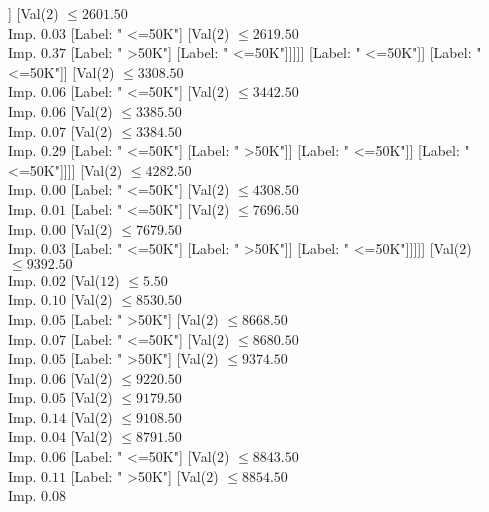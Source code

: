 \documentclass[margin=10pt]{standalone}
\begin{document}
\begin{forest}
													[Label: " >50K"]
													[Label: " <=50K"]]
												[Val($2$) $ \leq 2601.50$ \\ Imp. $0.03$
													[Label: " <=50K"]
													[Val($2$) $ \leq 2619.50$ \\ Imp. $0.37$
														[Label: " >50K"]
														[Label: " <=50K"]]]]]
										[Label: " <=50K"]]
									[Label: " <=50K"]]
								[Val($2$) $ \leq 3308.50$ \\ Imp. $0.06$
									[Label: " <=50K"]
									[Val($2$) $ \leq 3442.50$ \\ Imp. $0.06$
										[Val($2$) $ \leq 3385.50$ \\ Imp. $0.07$
											[Val($2$) $ \leq 3384.50$ \\ Imp. $0.29$
												[Label: " <=50K"]
												[Label: " >50K"]]
											[Label: " <=50K"]]
										[Label: " <=50K"]]]]
							[Val($2$) $ \leq 4282.50$ \\ Imp. $0.00$
								[Label: " <=50K"]
								[Val($2$) $ \leq 4308.50$ \\ Imp. $0.01$
									[Label: " <=50K"]
									[Val($2$) $ \leq 7696.50$ \\ Imp. $0.00$
										[Val($2$) $ \leq 7679.50$ \\ Imp. $0.03$
											[Label: " <=50K"]
											[Label: " >50K"]]
										[Label: " <=50K"]]]]]
						[Val($2$) $ \leq 9392.50$ \\ Imp. $0.02$
							[Val($12$) $ \leq 5.50$ \\ Imp. $0.10$
								[Val($2$) $ \leq 8530.50$ \\ Imp. $0.05$
									[Label: " >50K"]
									[Val($2$) $ \leq 8668.50$ \\ Imp. $0.07$
										[Label: " <=50K"]
										[Val($2$) $ \leq 8680.50$ \\ Imp. $0.05$
											[Label: " >50K"]
											[Val($2$) $ \leq 9374.50$ \\ Imp. $0.06$
												[Val($2$) $ \leq 9220.50$ \\ Imp. $0.05$
													[Val($2$) $ \leq 9179.50$ \\ Imp. $0.14$
														[Val($2$) $ \leq 9108.50$ \\ Imp. $0.04$
															[Val($2$) $ \leq 8791.50$ \\ Imp. $0.06$
																[Label: " <=50K"]
																[Val($2$) $ \leq 8843.50$ \\ Imp. $0.11$
																	[Label: " >50K"]
																	[Val($2$) $ \leq 8854.50$ \\ Imp. $0.08$

\end{forest}
\end{document}
